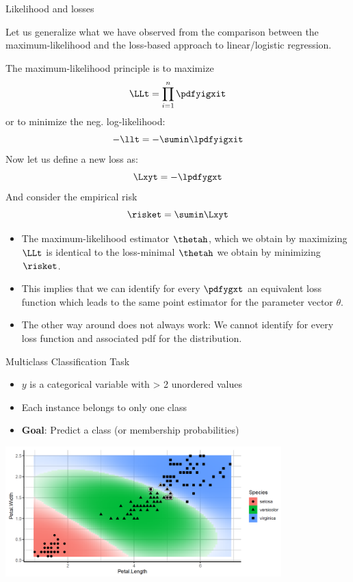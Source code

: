 \begin{vbframe}{Likelihood and losses}

Let us generalize what we have observed from the comparison between the maximum-likelihood
and the loss-based approach to linear/logistic regression.

The maximum-likelihood principle is to maximize
$$ \LLt = \prod_{i=1}^n \pdfyigxit $$
or to minimize the neg. log-likelihood:
$$ -\llt = -\sumin \lpdfyigxit $$
Now let us define a new loss as:
$$ \Lxyt = - \lpdfygxt $$
And consider the empirical risk
$$\risket = \sumin \Lxyt$$

\begin{itemize}
\item The maximum-likelihood estimator $\thetah$, which we obtain by maximizing $\LLt$ is identical
to the loss-minimal $\thetah$ we obtain by minimizing $\risket$.
\item This implies that we can identify for every 
$\pdfygxt$ an
equivalent loss function which leads to the same point estimator for the parameter vector $\theta$.
\item The other way around does not always work: We cannot identify for every loss function and associated
pdf for the distribution. 
\end{itemize}

\end{vbframe}


\begin{frame}{Multiclass Classification Task}

\begin{itemize}
\item \(y\) is a categorical variable with \textgreater{} 2 unordered values
\item Each instance belongs to only one class
\item \textbf{Goal}: Predict a class (or membership probabilities)
\end{itemize}

\begin{center}
\includegraphics[width=0.8\textwidth]{plots/multi-class.png}
\end{center}

\end{frame}

